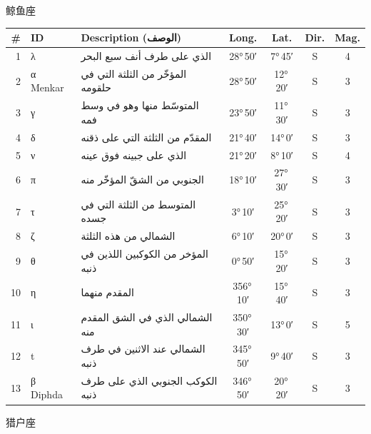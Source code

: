 \documentclass[9pt,a4paper]{extarticle}
\newcommand{\ar}[1]{{\arabicfont\textarabic{#1}}}
\begin{document}
\vspace{4pt}\quad\ar{قيطس}\quad 鲸鱼座
\begin{longtable}{r l >{\raggedright\arraybackslash}p{6.7cm} c c c c}
\toprule \# & ID & Description (\ar{الوصف}) & Long. & Lat. & Dir. & Mag.\\ \midrule\endhead
1 & λ & \ar{الذي على طرف أنف سبع البحر} & 28°\,50′ & 7°\,45′ & S & 4\\
2 & α Menkar & \ar{المؤخّر من الثلثة التي في حلقومه} & 28°\,50′ & 12°\,20′ & S & 3\\
3 & γ & \ar{المتوسّط منها وهو في وسط فمه} & 23°\,50′ & 11°\,30′ & S & 3\\
4 & δ & \ar{المقدّم من الثلثة التي على ذقنه} & 21°\,40′ & 14°\,0′ & S & 3\\
5 & ν & \ar{الذي على جبينه فوق عينه} & 21°\,20′ & 8°\,10′ & S & 4\\
6 & π & \ar{الجنوبي من الشقّ المؤخّر منه} & 18°\,10′ & 27°\,30′ & S & 3\\
7 & τ & \ar{المتوسط من الثلثة التي في جسده} & 3°\,10′ & 25°\,20′ & S & 3\\
8 & ζ & \ar{الشمالي من هذه الثلثة} & 6°\,10′ & 20°\,0′ & S & 3\\
9 & θ & \ar{المؤخر من الكوكبين اللذين في ذنبه} & 0°\,50′ & 15°\,20′ & S & 3\\
10 & η & \ar{المقدم منهما} & 356°\,10′ & 15°\,40′ & S & 3\\
11 & ι & \ar{الشمالي الذي في الشق المقدم منه} & 350°\,30′ & 13°\,0′ & S & 5\\
12 & t & \ar{الشمالي عند الاثنين في طرف ذنبه} & 345°\,50′ & 9°\,40′ & S & 3\\
13 & β Diphda & \ar{الكوكب الجنوبي الذي على طرف ذنبه} & 346°\,50′ & 20°\,20′ & S & 3\\
\bottomrule\end{longtable}
\vspace{4pt}\quad\ar{الجبار}\quad 猎户座
\end{document}
